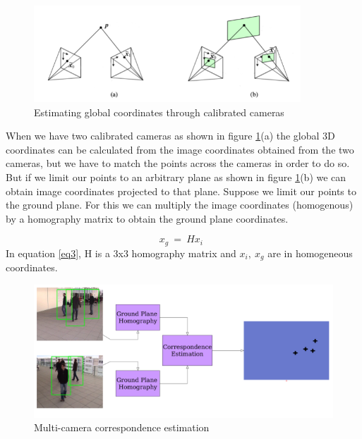 \documentclass[12pt,a4paper]{report}
\begin{document}
\begin{figure}[H]
\includegraphics[width=10cm]{multi_cam.png}
\centering
\caption{Estimating global coordinates through calibrated cameras}
\label{multi_cam}
\end{figure}
When we have two calibrated cameras as shown in figure \ref{multi_cam}(a) the global 3D coordinates can be calculated from the image coordinates obtained from the two cameras, but we have to match the points across the cameras in order to do so. But if we limit our points to an arbitrary plane as shown in figure \ref{multi_cam}(b) we can obtain image coordinates projected to that plane. Suppose we limit our points to the ground plane. For this we can multiply the image coordinates (homogenous) by a homography matrix to obtain the ground plane coordinates.

\begin{equation}
\label{eq3}
x_g\ =\ Hx_{i}\ \    
\end{equation}   %
In equation \ref{eq3}, H is a 3x3 homography matrix and $x_i,\ x_g$ are in homogeneous coordinates.
\begin{figure}[H]
\includegraphics[width=12cm]{homo.png}
\centering
\caption{Multi-camera correspondence estimation}
\label{homo}
\end{figure}
\end{document}
